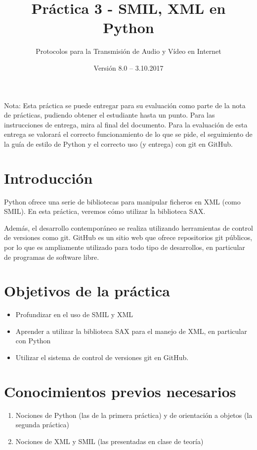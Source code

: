 \documentclass[11pt,a4paper]{article}
\begin{document}
\title{Práctica 3 - SMIL, XML en Python}
\author{Protocolos para la Transmisión de Audio y Vídeo en Internet}
\date{Versión 8.0 – 3.10.2017}


\maketitle


Nota: Esta práctica se puede entregar para su evaluación como parte de la nota de prácticas, pudiendo obtener el estudiante hasta un punto. Para las instrucciones de entrega, mira al final del documento. Para la evaluación de esta entrega se valorará el correcto funcionamiento de lo que se pide, el seguimiento de la guía de estilo de Python y el correcto uso (y entrega) con git en GitHub.

\section{Introducción}

Python ofrece una serie de bibliotecas para manipular ficheros en XML (como SMIL). En esta práctica, veremos cómo utilizar la biblioteca SAX.

Además, el desarrollo contemporáneo se realiza utilizando herramientas de control de versiones como git. GitHub es un sitio web que ofrece repositorios git públicos, por lo que es ampliamente utilizado para todo tipo de desarrollos, en particular de programas de software libre.

\section{Objetivos de la práctica}

\begin{itemize}
  \item Profundizar en el uso de SMIL y XML
  \item Aprender a utilizar la biblioteca SAX para el manejo de XML, en particular con Python
  \item Utilizar el sistema de control de versiones git en GitHub.
\end{itemize}

\section{Conocimientos previos necesarios}

\begin{enumerate}
  \item Nociones de Python (las de la primera práctica) y de orientación a objetos (la segunda práctica)
  \item Nociones de XML y SMIL (las presentadas en clase de teoría)
\end{enumerate}
\end{document}
